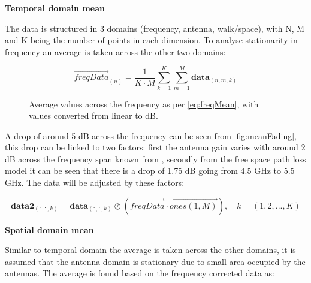 \textbf{Temporal domain mean}

The data is structured in 3 domains (frequency, antenna, walk/space), with N, M and K being the number of points in each dimension. To analyse stationarity in frequency an average is taken across the other two domains:

\begin{equation}\label{eq:freqMean}
\overrightarrow{freqData}_{(n)} = \frac{1}{K\cdot M}\sum_{k = 1}^{K}\sum_{m = 1}^{M} \textbf{data}_{(n,m,k)}
\end{equation}
\begin{where}
\end{where}


\begin{figure}[H]
\centering

\caption{Average values across the frequency as per \autoref{eq:freqMean}, with values converted from linear to dB.}
\label{fig:meanFading}
\end{figure}

A drop of around 5 dB across the frequency can be seen from \autoref{fig:meanFading}, this drop can be linked to two factors: first the antenna gain varies with around 2 dB across the frequency span known from , secondly from the free space path loss model it can be seen that there is a drop of 1.75 dB going from 4.5 GHz to 5.5 GHz. The data will be adjusted by these factors:

\begin{equation}
\textbf{data2}_{(:,:,k)} =  \textbf{data}_{(:,:,k)} \oslash \left(\overrightarrow{freqData}\cdot \overrightarrow{ones(1,M)}\right), \quad k = (1,2,...,K)
\end{equation}
\begin{where}
\end{where}

\textbf{Spatial domain mean}

Similar to temporal domain the average is taken across the other domains, it is assumed that the antenna domain is stationary due to small area occupied by the antennas. The average is found based on the frequency corrected data as:

